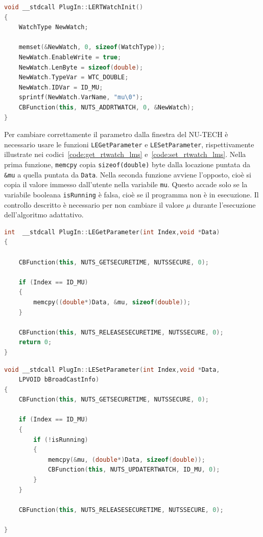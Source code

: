 \documentclass[12pt,a4paper,titlepage]{article}
\begin{document}
\begin{lstlisting}[language=cpp, label=code:rtwatch_lms, caption = Creazione RT Watch, breaklines = false, captionpos = b]
void __stdcall PlugIn::LERTWatchInit()
{
	WatchType NewWatch;

	memset(&NewWatch, 0, sizeof(WatchType));
	NewWatch.EnableWrite = true;
	NewWatch.LenByte = sizeof(double);
	NewWatch.TypeVar = WTC_DOUBLE;
	NewWatch.IDVar = ID_MU;
	sprintf(NewWatch.VarName, "mu\0");
	CBFunction(this, NUTS_ADDRTWATCH, 0, &NewWatch);
}
\end{lstlisting}
Per cambiare correttamente il parametro dalla finestra del NU-TECH è necessario usare le funzioni \texttt{LEGetParameter} e \texttt{LESetParameter}, rispettivamente illustrate nei codici~\ref{code:get_rtwatch_lms} e~\ref{code:set_rtwatch_lms}. Nella prima funzione, \texttt{memcpy} copia \texttt{sizeof(double)} byte dalla locazione puntata da \texttt{\&mu} a quella puntata da \texttt{Data}. Nella seconda funzione avviene l'opposto, cioè si copia il valore immesso dall'utente nella variabile \texttt{mu}. Questo accade solo se la variabile booleana \texttt{isRunning} è falsa, cioè se il programma non è in esecuzione. Il controllo descritto è necessario per non cambiare il valore $\mu$ durante l'esecuzione dell'algoritmo adattativo.

\begin{lstlisting}[language=cpp, label=code:get_rtwatch_lms, caption = Funzione \texttt{LEGetParameter}, breaklines = false, captionpos = b]
int  __stdcall PlugIn::LEGetParameter(int Index,void *Data)
{

	CBFunction(this, NUTS_GETSECURETIME, NUTSSECURE, 0);

	if (Index == ID_MU)
	{
		memcpy((double*)Data, &mu, sizeof(double));
	}

	CBFunction(this, NUTS_RELEASESECURETIME, NUTSSECURE, 0);
	return 0;
}
\end{lstlisting}


\begin{lstlisting}[language=cpp, label=code:set_rtwatch_lms, caption = Funzione \texttt{LESetParameter}, breaklines = false, captionpos = b]
void __stdcall PlugIn::LESetParameter(int Index,void *Data,
	LPVOID bBroadCastInfo)
{
	CBFunction(this, NUTS_GETSECURETIME, NUTSSECURE, 0);

	if (Index == ID_MU)
	{
		if (!isRunning)
		{
			memcpy(&mu, (double*)Data, sizeof(double));
			CBFunction(this, NUTS_UPDATERTWATCH, ID_MU, 0);
		}
	}

	CBFunction(this, NUTS_RELEASESECURETIME, NUTSSECURE, 0);

}
\end{lstlisting}
\end{document}
